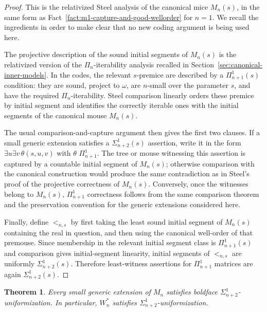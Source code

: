 \documentclass[a4paper,11pt]{article}
\newtheorem{theorem}{Theorem}[section]
\begin{document}
\begin{proof}
This is the relativized Steel analysis of the canonical mice \(M_n(s)\), in
the same form as Fact~\ref{fact:m1-capture-and-good-wellorder} for \(n=1\).
We recall the ingredients in order to make clear that no new coding argument
is being used here.

The projective description of the sound initial segments of \(M_n(s)\) is the
relativized version of the \(\Pi_n\)-iterability analysis recalled in
Section~\ref{sec:canonical-inner-models}.  In the codes, the relevant
\(s\)-premice are described by a \(\Pi^1_{n+1}(s)\) condition: they are sound,
project to \(\omega\), are \(n\)-small over the parameter \(s\), and have the
required \(\Pi_n\)-iterability.  Steel comparison linearly orders these premice
by initial segment and identifies the correctly iterable ones with the initial
segments of the canonical mouse \(M_n(s)\).

The usual comparison-and-capture argument then gives the first two clauses.  If
a small generic extension satisfies a \(\Sigma^1_{n+2}(s)\) assertion, write it
in the form \(\exists u\exists v\,\theta(s,u,v)\) with \(\theta\)
\(\Pi^1_{n+1}\).  The tree or mouse witnessing this assertion is captured by a
countable initial segment of \(M_n(s)\); otherwise comparison with the canonical
construction would produce the same contradiction as in Steel's proof of the
projective correctness of \(M_n(s)\).  Conversely, once the witnesses belong to
\(M_n(s)\), \(\Pi^1_{n+1}\) correctness follows from the same comparison theorem
and the preservation convention for the generic extensions considered here.

Finally, define \(<_{n,s}\) by first taking the least sound initial segment of
\(M_n(s)\) containing the real in question, and then using the canonical
well-order of that premouse.  Since membership in the relevant initial segment
class is \(\Pi^1_{n+1}(s)\) and comparison gives initial-segment linearity,
initial segments of \(<_{n,s}\) are uniformly \(\Sigma^1_{n+2}(s)\).  Therefore
least-witness assertions for \(\Pi^1_{n+1}\) matrices are again
\(\Sigma^1_{n+2}(s)\).
\end{proof}

\begin{theorem}\label{thm:small-mn-sigman2-uniformization}
Every small generic extension of \(M_n\) satisfies boldface
\(\Sigma^1_{n+2}\)-uniformization.  In particular, \(W_n^\ast\) satisfies
\(\Sigma^1_{n+2}\)-uniformization.
\end{theorem}
\end{document}
